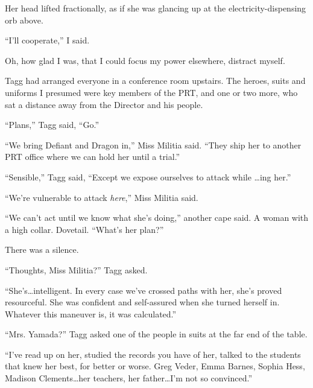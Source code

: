 Her head lifted fractionally, as if she was glancing up at the electricity-dispensing orb above.



``I'll cooperate,'' I said.



Oh, how glad I was, that I could focus my power elsewhere, distract myself.



Tagg had arranged everyone in a conference room upstairs.  The heroes, suits and uniforms I presumed were key members of the PRT, and one or two more, who sat a distance away from the Director and his people.



``Plans,'' Tagg said, ``Go.''



``We bring Defiant and Dragon in,'' Miss Militia said.  ``They ship her to another PRT office where we can hold her until a trial.''



``Sensible,'' Tagg said, ``Except we expose ourselves to attack while \ldots{}ing her.''



``We're vulnerable to attack \emph{here},'' Miss Militia said.



``We can't act until we know what she's doing,'' another cape said.  A woman with a high collar.  Dovetail.  ``What's her plan?''



There was a silence.



``Thoughts, Miss Militia?'' Tagg asked.



``She's\ldots intelligent.  In every case we've crossed paths with her, she's proved resourceful.  She was confident and self-assured when she turned herself in.  Whatever this maneuver is, it was calculated.''



``Mrs. Yamada?'' Tagg asked one of the people in suits at the far end of the table.



``I've read up on her, studied the records you have of her, talked to the students that knew her best, for better or worse.  Greg Veder, Emma Barnes, Sophia Hess, Madison Clements\ldots her teachers, her father\ldots I'm not so convinced.''



